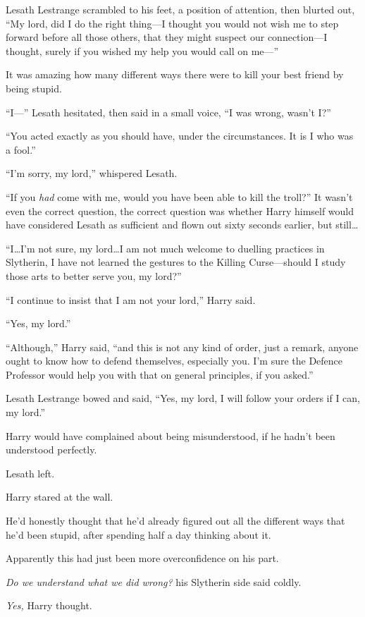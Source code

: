 Lesath Lestrange scrambled to his feet, a position of attention, then blurted out, “My lord, did I do the right thing—I thought you would not wish me to step forward before all those others, that they might suspect our connection—I thought, surely if you wished my help you would call on me—”

It was amazing how many different ways there were to kill your best friend by being stupid.

“I—” Lesath hesitated, then said in a small voice, “I was wrong, wasn’t I?”

“You acted exactly as you should have, under the circumstances. It is I who was a fool.”

“I’m sorry, my lord,” whispered Lesath.

“If you \emph{had} come with me, would you have been able to kill the troll?” It wasn’t even the correct question, the correct question was whether Harry himself would have considered Lesath as sufficient and flown out sixty seconds earlier, but still…

“I…I’m not sure, my lord…I am not much welcome to duelling practices in Slytherin, I have not learned the gestures to the Killing Curse—should I study those arts to better serve you, my lord?”

“I continue to insist that I am not your lord,” Harry said.

“Yes, my lord.”

“Although,” Harry said, “and this is not any kind of order, just a remark, anyone ought to know how to defend themselves, especially you. I’m sure the Defence Professor would help you with that on general principles, if you asked.”

Lesath Lestrange bowed and said, “Yes, my lord, I will follow your orders if I can, my lord.”

Harry would have complained about being misunderstood, if he hadn’t been understood perfectly.

Lesath left.

Harry stared at the wall.

He’d honestly thought that he’d already figured out all the different ways that he’d been stupid, after spending half a day thinking about it.

Apparently this had just been more overconfidence on his part.

\emph{Do we understand what we did wrong?} his Slytherin side said coldly.

\emph{Yes,} Harry thought.


